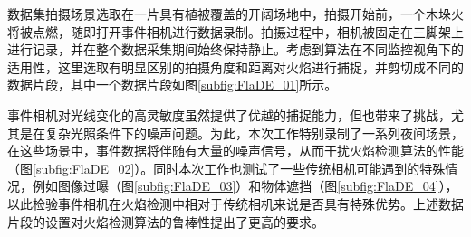 数据集拍摄场景选取在一片具有植被覆盖的开阔场地中，拍摄开始前，一个木垛火将被点燃，随即打开事件相机进行数据录制。拍摄过程中，相机被固定在三脚架上进行记录，并在整个数据采集期间始终保持静止。考虑到算法在不同监控视角下的适用性，这里选取有明显区别的拍摄角度和距离对火焰进行捕捉，并剪切成不同的数据片段，其中一个数据片段如图\ref{subfig:FlaDE_01}所示。

事件相机对光线变化的高灵敏度虽然提供了优越的捕捉能力，但也带来了挑战，尤其是在复杂光照条件下的噪声问题。为此，本次工作特别录制了一系列夜间场景，在这些场景中，事件数据将伴随有大量的噪声信号，从而干扰火焰检测算法的性能（图\ref{subfig:FlaDE_02}）。同时本次工作也测试了一些传统相机可能遇到的特殊情况，例如图像过曝（图\ref{subfig:FlaDE_03}）和物体遮挡（图\ref{subfig:FlaDE_04}），以此检验事件相机在火焰检测中相对于传统相机来说是否具有特殊优势。上述数据片段的设置对火焰检测算法的鲁棒性提出了更高的要求。

